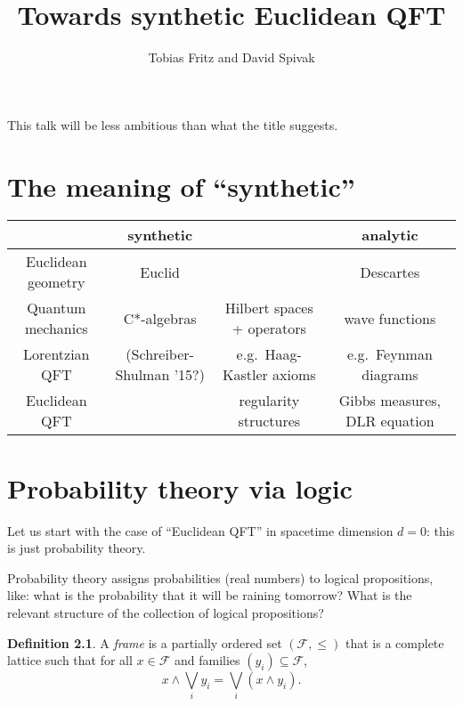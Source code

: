 \documentclass[11pt, oneside, article]{memoir}
\theoremstyle{plain}
\theoremstyle{definition}
\newtheorem{definition}[theorem]{Definition}
\theoremstyle{remark}
\begin{document}
\title{Towards synthetic Euclidean QFT}

\author{Tobias Fritz and David Spivak}

\maketitle




This talk will be less ambitious than what the title suggests.

\chapter{The meaning of ``synthetic''}

\begin{center}
\begin{tabular}{c|c|c|c}
& synthetic & & analytic \\\hline\hline
Euclidean geometry & Euclid & & Descartes \\\hline
Quantum mechanics & C*-algebras & Hilbert spaces + operators & wave functions \\\hline
Lorentzian QFT & (Schreiber-Shulman '15?) & e.g.~Haag-Kastler axioms & e.g.~Feynman diagrams \\\hline
Euclidean QFT & \fbox{\fbox{??}} & regularity structures & Gibbs measures, DLR equation
\end{tabular}
\end{center}

\chapter{Probability theory via logic}

Let us start with the case of ``Euclidean QFT'' in spacetime dimension $d = 0$: this is just probability theory.

Probability theory assigns probabilities (real numbers) to logical propositions, like: what is the probability that it will be raining tomorrow? What is the relevant structure of the collection of logical propositions?

\newcommand{\Frame}{\mathcal{F}}

\begin{definition}
A \emph{frame} is a partially ordered set $(\Frame,\leq)$ that is a complete lattice such that for all $x \in \Frame$ and families $(y_i) \subseteq \Frame$,
\[
	x \land \bigvee_{i} y_i = \bigvee_{i} (x \land y_i).
\]
\end{definition}
\end{document}
